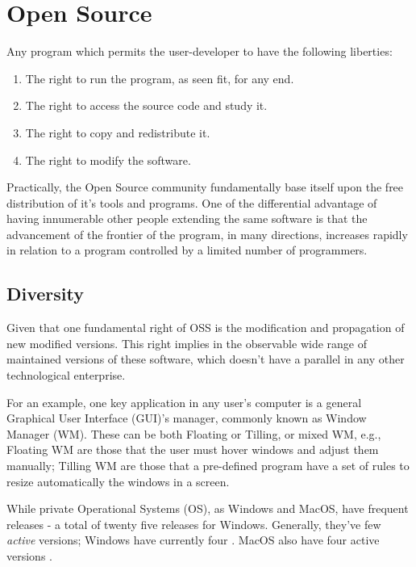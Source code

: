 \documentclass[
12pt,				%
openright,			%
oneside,			%
a4paper,			%
brazil,				%
english,			%
]{abntex2}
\begin{document}
\section{Open Source}
\label{sec:opensource}

Any program which permits the user-developer to have the following liberties:
\begin{enumerate}
\item The right to run the program, as seen fit, for any end.
\item The right to access the source code and study it.
\item The right to copy and redistribute it.
\item The right to modify the software.
\end{enumerate}

Practically, the Open Source community fundamentally base itself upon
the free distribution of it's tools and programs. One of the differential
advantage of having innumerable other people extending the same
software is that the advancement of the frontier of the program, in
many directions, increases rapidly in relation to a program controlled
by a limited number of programmers.

\subsection{Diversity}
\label{sec:diversity}

Given that one fundamental right of OSS is the modification and
propagation of new modified versions. This right implies in the
observable wide range of maintained versions of these software, which
doesn't have a parallel in any other technological enterprise. 

For an example, one key application in any user's computer is a general
Graphical User Interface (GUI)'s manager, commonly known as Window
Manager (WM). These can be both Floating or Tilling, or mixed WM,
e.g., Floating WM are those that the user must hover windows and
adjust them manually; Tilling WM are those that a pre-defined program
have a set of rules to resize automatically the windows in a screen.

While private Operational Systems (OS), as Windows and MacOS, have
frequent releases - a total of twenty five releases for
Windows. Generally, they've few \textit{active} versions; Windows have
currently four \cite{wikipedia_2021W}. MacOS also have four active
versions \cite{wikipedia_2021Mac}.
\end{document}

